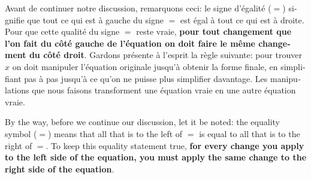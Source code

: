 \begin{paracol}{2}

	\begin{leftcolumn*}

		\begin{otherlanguage}{french}
	Avant de continuer notre discussion, remarquons ceci:
	le signe d'égalité ($=$) signifie que tout ce qui est à gauche du signe $=$ est égal à tout ce qui est à droite.
        Pour que cette qualité  du signe $=$ reste vraie,
        \textbf{pour tout changement que l'on fait du côté gauche de l'équation on doit faire le même changement du côté droit}. 
	Gardons présente à l'esprit la règle suivante:
	pour trouver $x$ on doit manipuler l'équation originale jusqu'à obtenir la forme finale,
	en simplifiant pas à pas jusqu'à ce qu'on ne puisse plus simplifier davantage.
	Les manipulations que nous faisons transforment une équation vraie en une autre équation vraie. %


		\end{otherlanguage}

	\end{leftcolumn*}



	\begin{rightcolumn}

	By the way, before we continue our discussion,
	let it be noted: the equality symbol ($=$) means that all that is to the left of $=$ 
	is equal to 
	all that is to the right of $=$. 
	To keep this equality statement true,  
	\textbf{for every change you apply to the left side of the equation, 
	you must apply the same change to the right side of the equation}.



	\end{rightcolumn}

\end{paracol}

